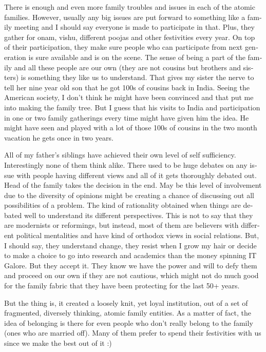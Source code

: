 \begin{english}
There is enough and even more family troubles and issues in each of the atomic families. However, usually any 
big issues are put forward to something like a family meeting and I should say everyone is made 
to participate in that. Plus, they gather for onam, vishu, different poojas and other festivities 
every year. On top of their participation, they make sure people who can participate from next
generation is sure available and is on the scene. The sense of being a part of the family and all these 
people are our own (they are not cousins but brothers and sisters) is something they like us to
understand. That gives my sister the nerve to tell her nine year old son that he got 100s of 
cousins back in India. Seeing the American society, I don't think he might have been convinced 
and that put me into making the family tree. But I guess that his visits to India and participation in one or 
two family gatherings every time might have given him the idea. He might have seen and 
played with a lot of those 100s of cousins in the two month vacation he gets once in two years. 

All of my father's siblings have achieved their own level of self sufficiency. Interestingly none of 
them think alike. There used to be huge debates on any issue with people having different views and all of it gets
thoroughly debated out. Head of the family takes the decision in the end. May be this level of
involvement due to the diversity of opinions might be creating a chance of discussing out all 
possibilities of a problem. The kind of rationality obtained when things are debated well to 
understand its different perspectives. This is not to say that they are modernists or reformings, but instead, most 
of them are believers with different political mentalities and have kind of orthodox views in 
social relations. But, I should say, they understand change, they resist when I grow my hair or 
decide to make a choice to go into research and academics than the money spinning IT Galore. 
But they accept it. They know we have the power and will to defy them and proceed on our own 
if they are not cautious, which might not do much good for the family fabric that they have been protecting 
for the last 50+ years.

But the thing is, it created a loosely knit, yet loyal institution, out of a set of fragmented, diversely
thinking, atomic family entities. As a matter of fact, the idea of belonging is there for even people who don't really 
belong to the family (ones who are married off). Many of them prefer to spend their
festivities with us since we make the best out of it :) 


\end{english}

